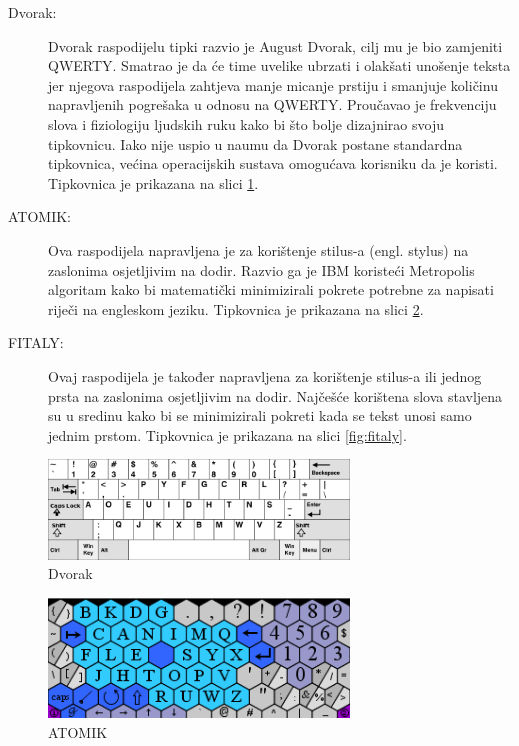\documentclass[times, utf8, zavrsni]{fer}
\begin{document}
\begin{description}
\item[Dvorak:]
Dvorak raspodijelu tipki razvio je August Dvorak, cilj mu je bio zamjeniti QWERTY. Smatrao je da će time uvelike ubrzati i olakšati unošenje teksta jer njegova raspodijela zahtjeva manje micanje prstiju i smanjuje količinu napravljenih pogrešaka u odnosu na QWERTY. Proučavao je frekvenciju slova i fiziologiju ljudskih ruku kako bi što bolje dizajnirao svoju tipkovnicu. Iako nije uspio u naumu da Dvorak postane standardna tipkovnica, većina operacijskih sustava omogućava korisniku da je koristi. Tipkovnica je prikazana na slici \ref{fig:dvorak}.
\item[ATOMIK:]
Ova raspodijela napravljena je za korištenje stilus-a (engl. stylus) na zaslonima osjetljivim na dodir. Razvio ga je IBM koristeći Metropolis algoritam kako bi matematički minimizirali pokrete potrebne za napisati riječi na engleskom jeziku. Tipkovnica je prikazana na slici \ref{fig:atomik}.
\item[FITALY:]
Ovaj raspodijela je također napravljena za korištenje stilus-a ili jednog prsta na zaslonima osjetljivim na dodir. Najčešće korištena slova stavljena su u sredinu kako bi se minimizirali pokreti kada se tekst unosi samo jednim prstom. Tipkovnica je prikazana na slici \ref{fig:fitaly}.
\end{description}

\begin{figure}[htb]
\centering
\includegraphics[width=8cm]{img/dvorak.png}
\caption{Dvorak}
\label{fig:dvorak}
\end{figure}

\begin{figure}[htb]
\centering
\includegraphics[width=8cm]{img/atomik.png}
\caption{ATOMIK}
\label{fig:atomik}
\end{figure}
\end{document}
